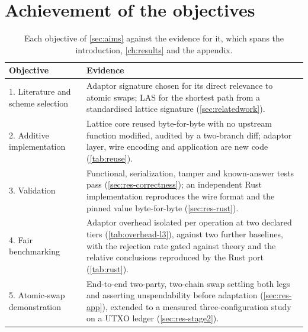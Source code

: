 \section{Achievement of the objectives}
\label{sec:eval-objectives}

\begin{table}[htbp]
  \centering
  \caption[Objectives against evidence]{Each objective of \cref{sec:aims} against the
           evidence for it, which spans the introduction, \cref{ch:results} and the
           appendix.}
  \label{tab:objectives}
  \begin{tabular}{@{}p{}p{}@{}}
    \toprule
    \textbf{Objective} & \textbf{Evidence} \\
    \midrule
    1. Literature and scheme selection
      & Adaptor signature chosen for its direct relevance to atomic swaps; LAS
        \cite{esgin2020post} for the shortest path from a standardised lattice signature
        (\cref{sec:relatedwork}). \\[3pt]
    2. Additive implementation
      & Lattice core reused byte-for-byte with no upstream function modified, audited by
        a two-branch diff; adaptor layer, wire encoding and application are new code
        (\cref{tab:reuse}). \\[3pt]
    3. Validation
      & Functional, serialization, tamper and known-answer tests pass
        (\cref{sec:res-correctness}); an independent Rust implementation reproduces the
        wire format and the pinned value byte-for-byte (\cref{sec:res-rust}). \\[3pt]
    4. Fair benchmarking
      & Adaptor overhead isolated per operation at two declared tiers
        (\cref{tab:overhead-l3}), against two further baselines, with the rejection rate
        gated against theory and the relative conclusions reproduced by the Rust port
        (\cref{tab:rust}). \\[3pt]
    5. Atomic-swap demonstration
      & End-to-end two-party, two-chain swap settling both legs and asserting
        unspendability before adaptation (\cref{sec:res-app}), extended to a measured
        three-configuration study on a UTXO ledger (\cref{sec:res-stage2}). \\
    \bottomrule
  \end{tabular}
\end{table}

